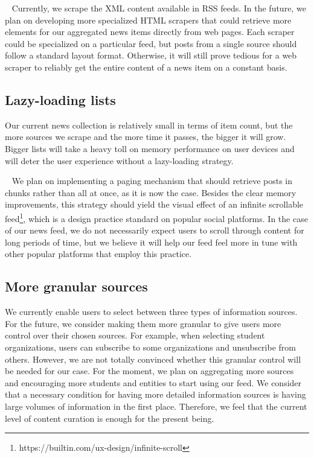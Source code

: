 ~
Currently, we scrape the XML content available in RSS feeds. In the future, we plan on developing more specialized HTML scrapers that could retrieve more elements for our aggregated news items directly from web pages. Each scraper could be specialized on a particular feed, but posts from a single source should follow a standard layout format. Otherwise, it will still prove tedious for a web scraper to reliably get the entire content of a news item on a constant basis. 

\subsection{Lazy-loading lists}

Our current news collection is relatively small in terms of item count, but the more sources we scrape and the more time it passes, the bigger it will grow. Bigger lists will take a heavy toll on memory performance on user devices and will deter the user experience without a lazy-loading strategy.

~
We plan on implementing a paging mechanism that should retrieve posts in chunks rather than all at once, as it is now the case. Besides the clear memory improvements, this strategy should yield the visual effect of an infinite scrollable feed\footnote{https://builtin.com/ux-design/infinite-scroll}, which is a design practice standard on popular social platforms. In the case of our news feed, we do not necessarily expect users to scroll through content for long periods of time, but we believe it will help our feed feel more in tune with other popular platforms that employ this practice.

\subsection{More granular sources}

We currently enable users to select between three types of information sources. For the future, we consider making them more granular to give users more control over their chosen sources. For example, when selecting student organizations, users can subscribe to some organizations and unsubscribe from others. However, we are not totally convinced whether this granular control will be needed for our case. For the moment, we plan on aggregating more sources and encouraging more students and entities to start using our feed. We consider that a necessary condition for having more detailed information sources is having large volumes of information in the first place. Therefore, we feel that the current level of content curation is enough for the present being.
